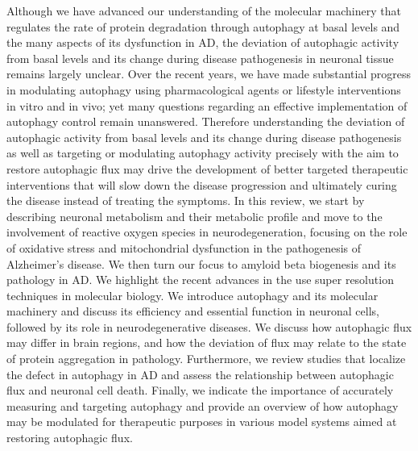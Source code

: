 Although we have advanced our understanding of the molecular machinery that regulates the rate of protein degradation through autophagy at basal levels and the many aspects of its dysfunction in AD, the deviation of autophagic activity from basal levels and its change during disease pathogenesis in neuronal tissue remains largely unclear. Over the recent years, we have made substantial progress in modulating autophagy using pharmacological agents \citep{Berger2006,Hebron2013,Ravikumar2002,Ravikumar2004,Rose2010} or lifestyle interventions \citep{Alirezaei2010,Kuma2004,Mizushima2004a,Scott2004} in vitro and in vivo; yet many questions regarding an effective implementation of autophagy control remain unanswered. Therefore understanding the deviation of autophagic activity from basal levels and its change during disease pathogenesis as well as targeting or modulating autophagy activity precisely with the aim to restore autophagic flux may drive the development of better targeted therapeutic interventions that will slow down the disease progression and ultimately curing the disease instead of treating the symptoms. In this review, we start by describing neuronal metabolism and their metabolic profile and move to the involvement of reactive oxygen species in neurodegeneration, focusing on the role of oxidative stress and mitochondrial dysfunction in the pathogenesis of Alzheimer’s disease. We then turn our focus to amyloid beta biogenesis and its pathology in AD.  We highlight the recent advances in the use super resolution techniques in molecular biology. We introduce autophagy and its molecular machinery and discuss its efficiency and essential function in neuronal cells, followed by its role in neurodegenerative diseases. We discuss how autophagic flux may differ in brain regions, and how the deviation of flux may relate to the state of protein aggregation in pathology. Furthermore, we review studies that localize the defect in autophagy in AD and assess the relationship between autophagic flux and neuronal cell death. Finally, we indicate the importance of accurately measuring and targeting autophagy and provide an overview of how autophagy may be modulated for therapeutic purposes in various model systems aimed at restoring autophagic flux. 

